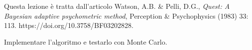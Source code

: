

Questa lezione è tratta dall'articolo
Watson, A.B. \& Pelli, D.G., \emph{Quest: A Bayesian adaptive psychometric method}, Perception \& Psychophysics (1983) 33: 113. https://doi.org/10.3758/BF03202828.

\begin{exercise}
	Implementare l'algoritmo e testarlo con Monte Carlo.
\end{exercise}
